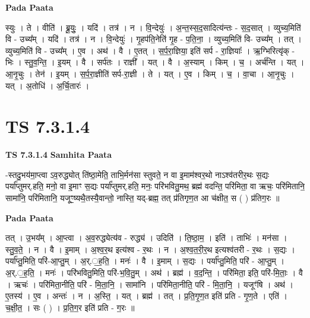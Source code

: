 \documentclass[17pt]{extarticle}
\begin{document}
\textbf{Pada Paata} \newline

स्युः । ते । वीति॑ । ब्रू॒युः॒ । यदि॑ । तत्र॑ । न । वि॒न्देयुः॑ । अ॒न्त॒स्स॒द॒सादित्य॑न्तः - स॒द॒सात् । व्युच्य॒मिति॑ वि - उच्य᳚म् । यदि॑ । तत्र॑ । न । वि॒न्देयुः॑ । गृ॒हप॑ति॒नेति॑ गृ॒ह - प॒ति॒ना॒ । व्युच्य॒मिति॑ वि- उच्य᳚म् । तत् । व्युच्य॒मिति॑ वि - उच्य᳚म् । ए॒व । अथ॑ । वै । ए॒तत् । स॒र्प॒रा॒ज्ञिया॒ इति॑ सर्प - रा॒ज्ञियाः᳚ । ऋ॒ग्भिरित्यृ॑क् - भिः । स्तु॒व॒न्ति॒ । इ॒यम् । वै । सर्प॑तः । राज्ञी᳚ । यत् । वै । अ॒स्याम् । किम् । च॒ । अर्च॑न्ति । यत् । आ॒नृ॒चुः । तेन॑ । इ॒यम् । स॒र्प॒रा॒ज्ञीति॑ सर्प-रा॒ज्ञी । ते । यत् । ए॒व । किम् । च॒ । वा॒चा । आ॒नृ॒चुः । यत् । अ॒तोधि॑ । अ॒र्चि॒तारः॑ ।  \newline





\section{ TS 7.3.1.4 }

\textbf{TS 7.3.1.4 } \newline
\textbf{Samhita Paata} \newline

-स्तदु॒भय॑मा॒प्त्वा ऽव॒रुद्ध्योत् ति॑ष्ठा॒मेति॒ ताभि॒र्मन॑सा स्तुवते॒ न वा इ॒माम॑श्वर॒थो नाऽश्व॑तरीर॒थः स॒द्यः पर्या᳚प्तुमर्.हति॒ मनो॒ वा इ॒माꣳ स॒द्यः पर्या᳚प्तुमर्.हति॒ मनः॒ परि॑भवितु॒मथ॒ ब्रह्म॑ वदन्ति॒ परि॑मिता॒ वा ऋचः॒ परि॑मितानि॒ सामा॑नि॒ परि॑मितानि॒ यजूꣳ॒॒ष्यथै॒तस्यै॒वान्तो॒ नास्ति॒ यद्-ब्रह्म॒ तत् प्र॑तिगृण॒त आ च॑क्षीत॒ स ( ) प्र॑तिग॒रः ॥ \newline

\textbf{Pada Paata} \newline

तत् । उ॒भय᳚म् । आ॒प्त्वा । अ॒व॒रुद्ध्येत्य॑व - रुद्ध्य॑ । उदिति॑ । ति॒ष्ठा॒म॒ । इति॑ । ताभिः॑ । मन॑सा । स्तु॒व॒ते॒ । न । वै । इ॒माम् । अ॒श्व॒र॒थ इत्य॑श्व - र॒थः । न । अ॒श्व॒त॒री॒र॒थ इत्यश्व॑तरी - र॒थः । स॒द्यः । पर्या᳚प्तु॒मिति॒ परि॑-आ॒प्तु॒म् । अ॒र्.॒ह॒ति॒ । मनः॑ । वै । इ॒माम् । स॒द्यः । पर्या᳚प्तु॒मिति॒ परि॑ - आ॒प्तु॒म् । अ॒र्.॒ह॒ति॒ । मनः॑ । परि॑भवितु॒मिति॒ परि॑-भ॒वि॒तु॒म् । अथ॑ । ब्रह्म॑ । व॒द॒न्ति॒ । परि॑मिता॒ इति॒ परि॑-मि॒ताः॒ । वै । ऋचः॑ । परि॑मिता॒नीति॒ परि॑ - मि॒ता॒नि॒ । सामा॑नि । परि॑मिता॒नीति॒ परि॑ - मि॒ता॒नि॒ । यजूꣳ॑षि । अथ॑ । ए॒तस्य॑ । ए॒व । अन्तः॑ । न । अ॒स्ति॒ । यत् । ब्रह्म॑ । तत् । प्र॒ति॒गृ॒ण॒त इति॑ प्रति - गृ॒ण॒ते । एति॑ । च॒क्षी॒त॒ । सः ( ) । प्र॒ति॒ग॒र इति॑ प्रति - ग॒रः ॥  \newline
\end{document}
